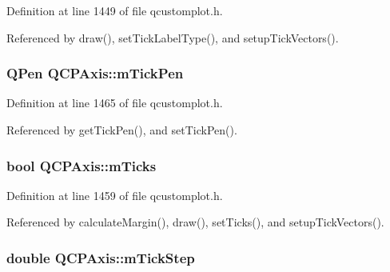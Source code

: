 Definition at line 1449 of file qcustomplot.\+h.



Referenced by draw(), set\+Tick\+Label\+Type(), and setup\+Tick\+Vectors().

\hypertarget{class_q_c_p_axis_a1d52c78c856d8bd1f331d4ec4e63d944}{}
\subsubsection[{m\+Tick\+Pen}]{\setlength{\rightskip}{0pt plus 5cm}Q\+Pen Q\+C\+P\+Axis\+::m\+Tick\+Pen\hspace{0.3cm}{\ttfamily [protected]}}\label{class_q_c_p_axis_a1d52c78c856d8bd1f331d4ec4e63d944}


Definition at line 1465 of file qcustomplot.\+h.



Referenced by get\+Tick\+Pen(), and set\+Tick\+Pen().

\hypertarget{class_q_c_p_axis_ab111e74bba22e06848897c932fc549fe}{}
\subsubsection[{m\+Ticks}]{\setlength{\rightskip}{0pt plus 5cm}bool Q\+C\+P\+Axis\+::m\+Ticks\hspace{0.3cm}{\ttfamily [protected]}}\label{class_q_c_p_axis_ab111e74bba22e06848897c932fc549fe}


Definition at line 1459 of file qcustomplot.\+h.



Referenced by calculate\+Margin(), draw(), set\+Ticks(), and setup\+Tick\+Vectors().

\hypertarget{class_q_c_p_axis_a4fe96830fc5a2711e20fe5edccfe2ed3}{}
\subsubsection[{m\+Tick\+Step}]{\setlength{\rightskip}{0pt plus 5cm}double Q\+C\+P\+Axis\+::m\+Tick\+Step\hspace{0.3cm}{\ttfamily [protected]}}\label{class_q_c_p_axis_a4fe96830fc5a2711e20fe5edccfe2ed3}


